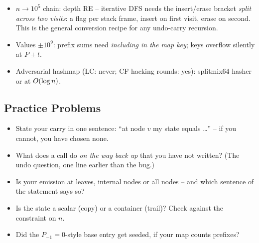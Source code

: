 \begin{hardeningbox}
\begin{itemize}[nosep, leftmargin=1.4em]
  \item $n \to 10^{5}$ chain: depth RE -- iterative DFS needs the insert/erase
        bracket \emph{split across two visits}: a  flag per stack
        frame, insert on first visit, erase on second. This is the general
        conversion recipe for any undo-carry recursion.
  \item Values $\pm10^{9}$: prefix sums need  \emph{including in
        the map key};  keys overflow silently at $P \pm t$.
  \item Adversarial hashmap (LC: never; CF hacking rounds: yes): splitmix64
        hasher or  at $O(\log n)$.
\end{itemize}
\end{hardeningbox}

\subsection{Practice Problems}

\begin{stuckbox}
\begin{itemize}[nosep, leftmargin=1.4em]
  \item State your carry in one sentence: ``at node $v$ my state equals \dots''
        -- if you cannot, you have chosen none.
  \item What does a call do \emph{on the way back up} that you have not written?
        (The undo question, one line earlier than the bug.)
  \item Is your emission at leaves, internal nodes or all nodes -- and which
        sentence of the statement says so?
  \item Is the state a scalar (copy) or a container (trail)? Check
         against the constraint on $n$.
  \item Did the $P_{-1} = 0$-style base entry get seeded, if your map counts
        prefixes?
\end{itemize}
\end{stuckbox}

